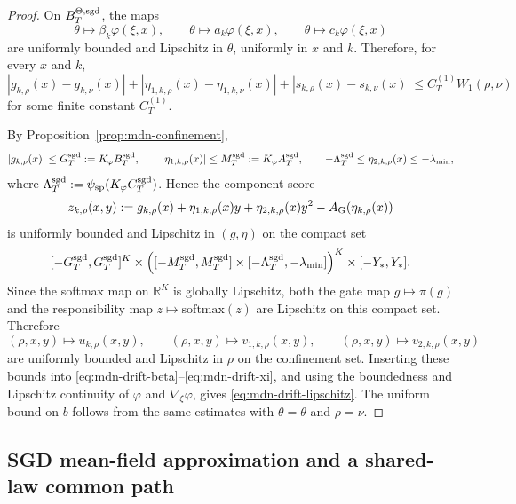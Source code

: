 \documentclass[11pt]{article}
\theoremstyle{definition}
\newcommand{\R}{\mathbb{R}}
\newcommand{\softmax}{\mathrm{softmax}}
\begin{document}
\begin{proof}
On $B_T^{\Theta,\rm sgd}$, the maps
\[
  \theta\mapsto \beta_k\varphi(\xi,x),
  \qquad
  \theta\mapsto a_k\varphi(\xi,x),
  \qquad
  \theta\mapsto c_k\varphi(\xi,x)
\]
are uniformly bounded and Lipschitz in $\theta$, uniformly in $x$ and $k$.
Therefore, for every $x$ and $k$,
\[
  |g_{k,\rho}(x)-g_{k,\nu}(x)|
  +
  |\eta_{1,k,\rho}(x)-\eta_{1,k,\nu}(x)|
  +
  |s_{k,\rho}(x)-s_{k,\nu}(x)|
  \le
  C_T^{(1)} W_1(\rho,\nu)
\]
for some finite constant $C_T^{(1)}$.

By Proposition~\ref{prop:mdn-confinement},
\[
  |g_{k,\rho}(x)|\le G_T^{\rm sgd}:=K_\varphi B_T^{\rm sgd},
  \qquad
  |\eta_{1,k,\rho}(x)|\le M_T^{\rm sgd}:=K_\varphi A_T^{\rm sgd},
  \qquad
  -\Lambda_T^{\rm sgd}\le \eta_{2,k,\rho}(x)\le -\lambda_{\min},
\]
where $\Lambda_T^{\rm sgd}:=\psi_{\rm sp}(K_\varphi C_T^{\rm sgd})$. Hence the
component score
\[
  z_{k,\rho}(x,y)
  :=
  g_{k,\rho}(x)
  +
  \eta_{1,k,\rho}(x)y
  +
  \eta_{2,k,\rho}(x)y^2
  -
  A_{\rm G}(\eta_{k,\rho}(x))
\]
is uniformly bounded and Lipschitz in $(g,\eta)$ on the compact set
\[
  [-G_T^{\rm sgd},G_T^{\rm sgd}]^K
  \times
  \Big(
    [-M_T^{\rm sgd},M_T^{\rm sgd}]
    \times
    [-\Lambda_T^{\rm sgd},-\lambda_{\min}]
  \Big)^K
  \times
  [-Y_\ast,Y_\ast].
\]
Since the softmax map on $\R^K$ is globally Lipschitz, both the gate map
$g\mapsto \pi(g)$ and the responsibility map $z\mapsto \softmax(z)$ are
Lipschitz on this compact set. Therefore
\[
  (\rho,x,y)\mapsto u_{k,\rho}(x,y),
  \qquad
  (\rho,x,y)\mapsto v_{1,k,\rho}(x,y),
  \qquad
  (\rho,x,y)\mapsto v_{2,k,\rho}(x,y)
\]
are uniformly bounded and Lipschitz in $\rho$ on the confinement set. Inserting
these bounds into \eqref{eq:mdn-drift-beta}--\eqref{eq:mdn-drift-xi}, and using
the boundedness and Lipschitz continuity of $\varphi$ and $\nabla_\xi\varphi$,
gives \eqref{eq:mdn-drift-lipschitz}. The uniform bound on $b$ follows from the
same estimates with $\bar\theta=\theta$ and $\rho=\nu$.
\end{proof}

\subsection{SGD mean-field approximation and a shared-law common path}
\end{document}
